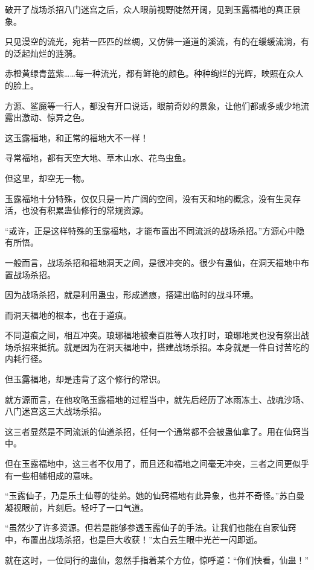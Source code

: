 
\begin{this_body}

破开了战场杀招八门迷宫之后，众人眼前视野陡然开阔，见到玉露福地的真正景象。

只见漫空的流光，宛若一匹匹的丝绸，又仿佛一道道的溪流，有的在缓缓流淌，有的泛起灿烂的涟漪。

赤橙黄绿青蓝紫……每一种流光，都有鲜艳的颜色。种种绚烂的光辉，映照在众人的脸上。

方源、鲨魔等一行人，都没有开口说话，眼前奇妙的景象，让他们都或多或少地流露出激动、惊异之色。

这玉露福地，和正常的福地大不一样！

寻常福地，都有天空大地、草木山水、花鸟虫鱼。

但这里，却空无一物。

玉露福地十分特殊，仅仅只是一片广阔的空间，没有天和地的概念，没有生灵存活，也没有积累蛊仙修行的常规资源。

“或许，正是这样特殊的玉露福地，才能布置出不同流派的战场杀招。”方源心中隐有所悟。

一般而言，战场杀招和福地洞天之间，是很冲突的。很少有蛊仙，在洞天福地中布置战场杀招。

因为战场杀招，就是利用蛊虫，形成道痕，搭建出临时的战斗环境。

而洞天福地的根本，也在于道痕。

不同道痕之间，相互冲突。琅琊福地被秦百胜等人攻打时，琅琊地灵也没有祭出战场杀招来抵抗。就是因为在洞天福地中，搭建战场杀招。本身就是一件自讨苦吃的内耗行径。

但玉露福地，却是违背了这个修行的常识。

就方源而言，在他攻略玉露福地的过程当中，就先后经历了冰雨冻土、战魂沙场、八门迷宫这三大战场杀招。

这三者显然是不同流派的仙道杀招，任何一个通常都不会被蛊仙拿了。用在仙窍当中。

但在玉露福地中，这三者不仅用了，而且还和福地之间毫无冲突，三者之间更似乎有一些相辅相成的意味。

“玉露仙子，乃是乐土仙尊的徒弟。她的仙窍福地有此异象，也并不奇怪。”苏白曼凝视眼前，片刻后。轻吁了一口气道。

“虽然少了许多资源。但若是能够参透玉露仙子的手法。让我们也能在自家仙窍中，布置出战场杀招，也是巨大收获！”太白云生眼中光芒一闪即逝。

就在这时，一位同行的蛊仙，忽然手指着某个方位，惊呼道：“你们快看，仙蛊！”


\end{this_body}
